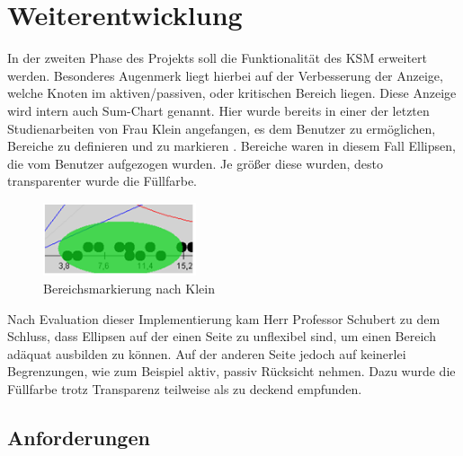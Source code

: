 \section{Weiterentwicklung}

In der zweiten Phase des Projekts soll die Funktionalität des KSM erweitert werden. Besonderes Augenmerk liegt hierbei auf der Verbesserung der Anzeige, welche Knoten im aktiven/passiven, oder kritischen Bereich liegen. Diese Anzeige wird intern auch Sum-Chart genannt. Hier wurde bereits in einer der letzten Studienarbeiten von Frau Klein angefangen, es dem Benutzer zu ermöglichen, Bereiche zu definieren und zu markieren \cite{bib:klein}. Bereiche waren in diesem Fall Ellipsen, die vom Benutzer aufgezogen wurden. Je größer diese wurden, desto transparenter wurde die Füllfarbe.
\begin{figure}[h]
	\centering
	\includegraphics[width=0.4\textwidth]{pictures/ellipse.png}
	\caption{Bereichsmarkierung nach Klein \cite{bib:klein}}
	\label{magic-cycle}
\end{figure}

Nach Evaluation dieser Implementierung kam Herr Professor Schubert zu dem Schluss, dass Ellipsen auf der einen Seite zu unflexibel sind, um einen Bereich adäquat ausbilden zu können. Auf der anderen Seite jedoch auf keinerlei Begrenzungen, wie zum Beispiel aktiv, passiv Rücksicht nehmen. Dazu wurde die Füllfarbe trotz Transparenz teilweise als zu deckend empfunden.

\subsection{Anforderungen}


